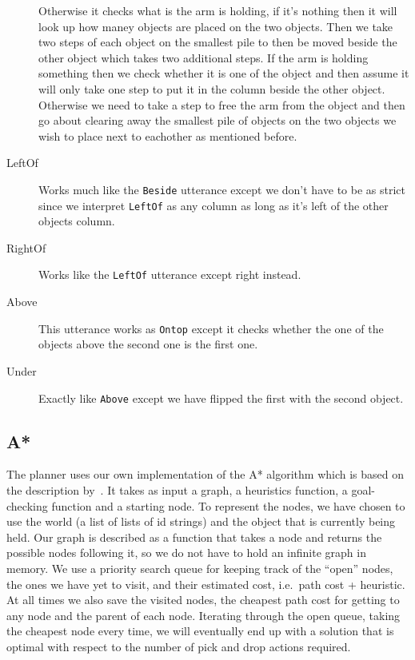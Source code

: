 \begin{description}
    Otherwise it checks what is the arm is holding, if it's nothing then it will look up how maney objects are placed on the two objects.
    Then we take two steps of each object on the smallest pile to then be moved beside the other object which takes two additional steps.
    If the arm is holding something then we check whether it is one of the object and then assume it will only take one step to put it in the column beside the other object.
    Otherwise we need to take a step to free the arm from the object and then go about clearing away the smallest pile of objects on the two objects we wish to place next to eachother as mentioned before.
  \item[LeftOf] Works much like the \verb|Beside| utterance except we don't have to be as strict since we interpret \verb|LeftOf| as any column as long as it's left of the other objects column.
  \item[RightOf] Works like the \verb|LeftOf| utterance except right instead.
  \item[Above] This utterance works as \verb|Ontop| except it checks whether the one of the objects above the second one is the first one.
  \item[Under] Exactly like \verb|Above| except we have flipped the first with the second object.
\end{description}

\subsection*{A*}
The planner uses our own implementation of the A* algorithm which is based on the description by~\cite{apath}.
It takes as input a graph, a heuristics function, a goal-checking function and a starting node.
To represent the nodes, we have chosen to use the world (a list of lists of id strings) and the object that is currently being held.
Our graph is described as a function that takes a node and returns the possible nodes following it, so we do not have to hold an infinite graph in memory.
We use a priority search queue for keeping track of the ``open'' nodes, the ones we have yet to visit, and their estimated cost, i.e.\ path cost + heuristic.
At all times we also save the visited nodes, the cheapest path cost for getting to any node and the parent of each node.
Iterating through the open queue, taking the cheapest node every time, we will eventually end up with a solution that is optimal with respect to the number of pick and drop actions required.


